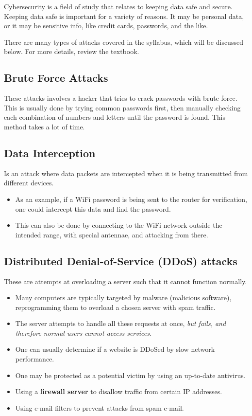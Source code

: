 \documentclass[../main.tex]{subfiles}
\begin{document}
Cybersecurity is a field of study that relates to keeping data safe and secure. Keeping data safe is important for a variety of reasons. It may be personal data, or it may be sensitive info, like credit cards, passwords, and the like.

There are many types of attacks covered in the syllabus, which will be discussed below. For more details, review the textbook.

\subsection{Brute Force Attacks}

These attacks involves a hacker that tries to crack passwords with brute force. This is usually done by trying common passwords first, then manually checking each combination of numbers and letters until the password is found. This method takes a lot of time.

\subsection{Data Interception}

Is an attack where data packets are intercepted when it is being transmitted from different devices.
\begin{itemize}
    \item As an example, if a WiFi password is being sent to the router for verification, one could intercept this data and
          find the password.
    \item This can also be done by connecting to the WiFi network outside the intended range, with special antennae, and attacking
          from there.
\end{itemize}

\subsection{Distributed Denial-of-Service (DDoS) attacks}

These are attempts at overloading a server such that it cannot function normally.
\begin{itemize}
    \item Many computers are typically targeted by malware (malicious software), reprogramming them to overload a chosen server with spam traffic.
    \item The server attempts to handle all these requests at once, \emph{but fails, and therefore normal users cannot access services.}
    \item One can usually determine if a website is DDoSed by slow network performance.
    \item One may be protected as a potential victim by using an up-to-date antivirus.
    \item Using a \textbf{firewall server} to disallow traffic from certain IP addresses.
    \item Using e-mail filters to prevent attacks from spam e-mail.
\end{itemize}
\end{document}
